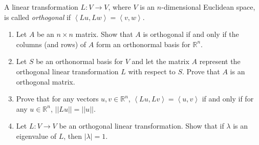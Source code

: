 \documentclass[12pt,letterpaper,boxed]{math_hw_pset}
\newcommand{\rr}{\mathbb{R}}
\newcommand{\<}{\left<}
\renewcommand{\>}{\right>}
\begin{document}
\newpage
\begin{exercise}[A12.]
    A linear transformation $L: V \to V$, where $V$ is an $n$-dimensional Euclidean space, 
    is called \emph{orthogonal} if $\left<Lu, Lw \right> = \left< v, w \right>$. 
    \begin{enumerate}
        \item Let $A$ be an $n \times n$ matrix. Show that $A$ is orthogonal if and only if 
        the columns (and rows) of $A$ form an orthonormal basis for $\rr^n$. 

        \item Let $S$ be an orthonormal basis for $V$ and let the matrix $A$ represent  the 
        orthogonal linear transformation $L$ with respect to $S$. Prove that $A$ is an orthogonal 
        matrix. 

        \item Prove that for any vectors $u, v \in \rr^n$, $\left< Lu, Lv\right> =  \left<u,v \right>$
        if and only if for any $u \in \rr^n$, $||Lu||= ||u||$. 

        \item Let $L: V \to V$ be an orthogonal linear transformation. Show that if $\lambda$ is 
        an eigenvalue of $L$, then $|\lambda| = 1$. 
    \end{enumerate}
\end{exercise}
\end{document}
